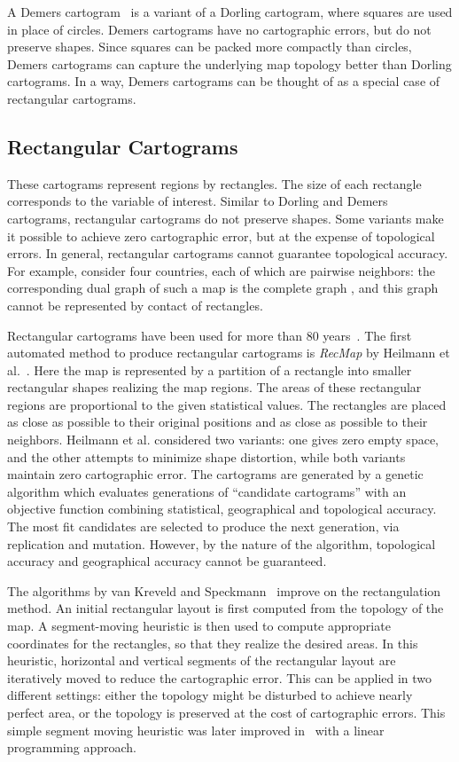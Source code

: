 \documentclass{egpubl}
\begin{document}
A Demers cartogram~\cite{Demers} is a variant of a Dorling cartogram, where squares are used in place of circles.  Demers cartograms have no cartographic errors, but do not preserve shapes. Since squares can be packed more compactly than circles, Demers cartograms can capture the underlying map topology better than Dorling cartograms. In a way, Demers cartograms can be thought of as a special case of rectangular cartograms.


\subsection{Rectangular Cartograms}
These cartograms represent regions by rectangles. The size of each rectangle corresponds to the variable of interest. Similar to Dorling and Demers cartograms, rectangular cartograms do not preserve shapes. Some variants make it possible to achieve zero cartographic error, but at the expense of topological errors. In general, rectangular cartograms cannot guarantee topological accuracy. For example, consider four countries, each of which are pairwise neighbors: the corresponding dual graph of such a map is the complete graph , and this graph cannot be represented by contact of rectangles. 


Rectangular cartograms have been used for more than 80 years~\cite{Raisz34}. 
The first automated method to produce rectangular cartograms is
 \textit{RecMap} by Heilmann et al.~\cite{hkps04}. Here the map is represented by a partition of a rectangle into smaller rectangular shapes realizing the map regions. The areas of these rectangular regions are proportional to the given statistical values. The rectangles are placed as close as possible to their original positions and as close as possible to their neighbors. Heilmann et al. considered two variants: one gives zero empty space, and the other attempts to minimize shape distortion, while both variants maintain zero cartographic error. 
The cartograms are generated by a genetic algorithm which evaluates generations of ``candidate cartograms'' with an objective function combining statistical, geographical and topological accuracy. The most fit candidates are selected to produce the next generation, via replication and mutation. However, by the nature of the algorithm, topological accuracy and geographical accuracy cannot be guaranteed.
 


The algorithms by van Kreveld and Speckmann~\cite{KS05,ks07} improve on the rectangulation method. An initial rectangular layout is first computed from the topology of the map. A segment-moving heuristic is then used to compute appropriate coordinates for the rectangles, so that they realize the desired areas. In this heuristic, horizontal and vertical segments of the rectangular layout are iteratively moved to reduce the cartographic error. This can be applied in two different settings: either the topology might be disturbed to achieve nearly perfect area, or the topology is preserved at the cost of cartographic errors. This simple segment moving heuristic was later improved in~\cite{SKF06} with a linear programming approach.
\end{document}
